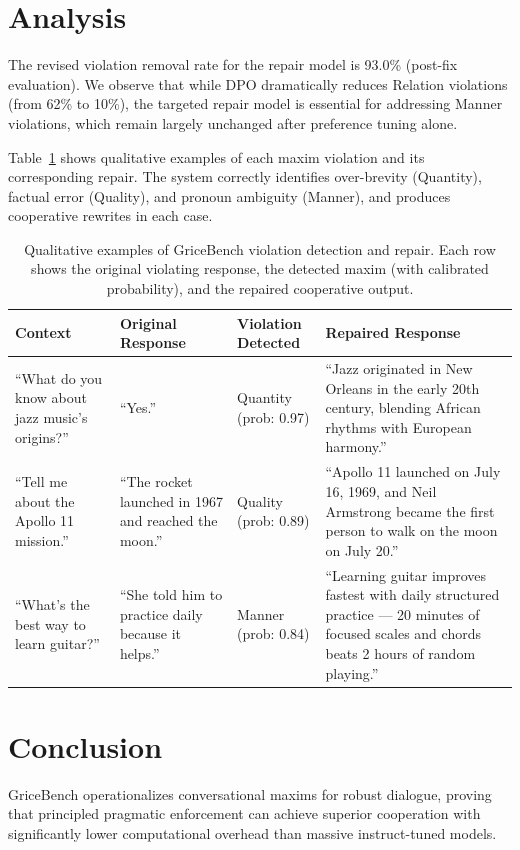 \documentclass[11pt]{article}
\begin{document}
\section{Analysis}
\label{sec:analysis}

The revised violation removal rate for the repair model is 93.0\% (post-fix evaluation). We observe that while DPO dramatically reduces Relation violations (from 62\% to 10\%), the targeted repair model is essential for addressing Manner violations, which remain largely unchanged after preference tuning alone.

Table~\ref{tab:examples} shows qualitative examples of each maxim violation
and its corresponding repair. The system correctly identifies over-brevity
(Quantity), factual error (Quality), and pronoun ambiguity (Manner), and
produces cooperative rewrites in each case.

\begin{table}[t]
\centering
\caption{Qualitative examples of GriceBench violation detection and repair.
         Each row shows the original violating response, the detected maxim
         (with calibrated probability), and the repaired cooperative output.}
\label{tab:examples}
\small
\begin{tabular}{p{3cm}p{3.5cm}p{2cm}p{3.5cm}}
\toprule
\textbf{Context} & \textbf{Original Response} & \textbf{Violation Detected} & \textbf{Repaired Response} \\
\midrule
``What do you know about jazz music's origins?'' &
``Yes.'' &
Quantity (prob: 0.97) &
``Jazz originated in New Orleans in the early 20th century, blending African rhythms with European harmony.'' \\
\midrule
``Tell me about the Apollo 11 mission.'' &
``The rocket launched in 1967 and reached the moon.'' &
Quality (prob: 0.89) &
``Apollo 11 launched on July 16, 1969, and Neil Armstrong became the first person to walk on the moon on July 20.'' \\
\midrule
``What's the best way to learn guitar?'' &
``She told him to practice daily because it helps.'' &
Manner (prob: 0.84) &
``Learning guitar improves fastest with daily structured practice --- 20 minutes of focused scales and chords beats 2 hours of random playing.'' \\
\bottomrule
\end{tabular}
\end{table}

\section{Conclusion}
\label{sec:conclusion}
GriceBench operationalizes conversational maxims for robust dialogue, proving that principled pragmatic enforcement can achieve superior cooperation with significantly lower computational overhead than massive instruct-tuned models.
\end{document}
